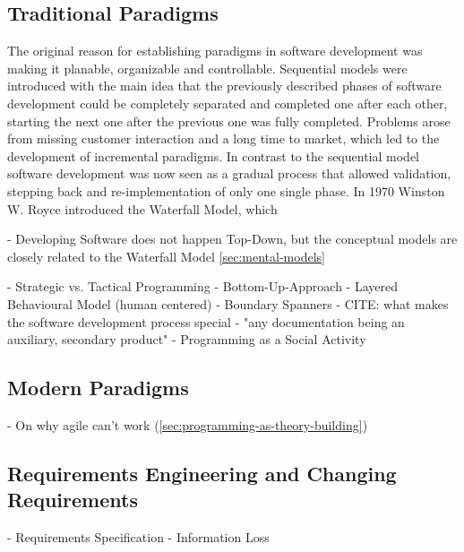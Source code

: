 \subsection{Traditional Paradigms}
\label{sub:traditional-software-development-paradigms}
The original reason for establishing paradigms in software development was making it planable, organizable and controllable.
Sequential models were introduced with the main idea that the previously described phases of software development could be completely separated and completed one after each other, starting the next one after the previous one was fully completed.
Problems arose from missing customer interaction and a long time to market, which led to the development of incremental paradigms.
In contrast to the sequential model software development was now seen as a gradual process that allowed validation, stepping back and re-implementation of only one single phase.
In 1970 Winston W. Royce introduced the Waterfall Model, which 

- Developing Software does not happen Top-Down, but the conceptual models are closely related to the Waterfall Model \ref{sec:mental-models} \autocite[275]{kitchenham_research_1990}


- Strategic vs. Tactical Programming \autocite[13--18]{ousterhout_philosophy_2018}
- Bottom-Up-Approach \autocite[17]{horrocks_constructing_1999}
- Layered Behavioural Model (human centered) \autocite[254]{curtis_psychology_1990}
- Boundary Spanners \autocite[264]{curtis_psychology_1990}
- CITE: what makes the software development process special \autocite[274]{kitchenham_research_1990}
- "any documentation being an auxiliary, secondary product" \autocite{naur_programming_1985}
- Programming as a Social Activity \autocite{weinberg_psychology_1971}

\subsection{Modern Paradigms}
\label{sub:modern-software-development-paradigms}
- On why agile can't work (\ref{sec:programming-as-theory-building}) \autocite[232--233]{naur_programming_1985}
\subsection{Requirements Engineering and Changing Requirements}
- Requirements Specification \autocite[32]{leveson_experiences_1991}
- Information Loss \autocite[265]{curtis_psychology_1990}

